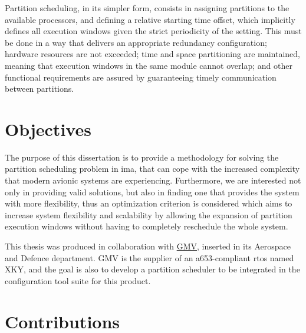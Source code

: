 \documentclass[main.tex]{subfiles}
\begin{document}
Partition scheduling, in its simpler form, consists in assigning partitions to the available processors, and defining a relative starting time offset, which implicitly defines all execution windows given the strict periodicity of the setting.
This must be done in a way that delivers an appropriate redundancy configuration; hardware resources are not exceeded; time and space partitioning are maintained, meaning that execution windows in the same module cannot overlap; and other functional requirements are assured by guaranteeing timely communication between partitions.

\section{Objectives}

The purpose of this dissertation is to provide a methodology for solving the partition scheduling problem in \gls{ima}, that can cope with the increased complexity that modern avionic systems are experiencing.
Furthermore, we are interested not only in providing valid solutions, but also in finding one that provides the system with more flexibility, thus an optimization criterion is considered which aims to increase system flexibility and scalability by allowing the expansion of partition execution windows without having to completely reschedule the whole system.

This thesis was produced in collaboration with \href{https://www.gmv.com/en/}{GMV}, inserted in its Aerospace and Defence department.
GMV is the supplier of an \gls{a653}-compliant \gls{rtos} named XKY, and the goal is also to develop a partition scheduler to be integrated in the configuration tool suite for this product.

\section{Contributions}
\end{document}
